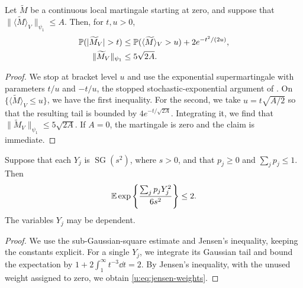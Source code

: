 \begin{lemma}\label{u:lem:bracket-tail}
Let $\widetilde M$ be a continuous local martingale starting at zero,
and suppose that $\|\langle\widetilde M\rangle_V\|_{\psi_1}\le A$.
Then, for $t,u>0$,
\begin{equation}\label{u:eq:bracket-tail}
\begin{aligned}
 \PP(|\widetilde M_V|>t)
 &\le\PP(\langle\widetilde M\rangle_V>u)+2e^{-t^2/(2u)},\\
 \|\widetilde M_V\|_{\psi_1}&\le5\sqrt{2A}.
\end{aligned}
\end{equation}
\end{lemma}

\begin{proof}
We stop at bracket level $u$ and use the exponential supermartingale
with parameters $t/u$ and $-t/u$, the stopped stochastic-exponential
argument of \cite[Section~3.5]{karatzas-shreve-1991}. On
$\{\langle\widetilde M\rangle_V\le u\}$, we have the first inequality.
For the second, we take $u=t\sqrt{A/2}$ so that the resulting tail is
bounded by $4e^{-t/\sqrt{2A}}$. Integrating it, we find that
$\|\widetilde M_V\|_{\psi_1}\le5\sqrt{2A}$. If $A=0$, the martingale is
zero and the claim is immediate.
\end{proof}

\begin{lemma}\label{u:lem:jensen-weights}
Suppose that each $Y_j$ is $\operatorname{SG}(s^2)$, where $s>0$,
and that $p_j\ge0$ and $\sum_jp_j\le1$. Then
\begin{equation}\label{u:eq:jensen-weights}
 \mathbb E\exp\left\{\frac{\sum_jp_jY_j^2}{6s^2}\right\}\le2.
\end{equation}
The variables $Y_j$ may be dependent.
\end{lemma}

\begin{proof}
We use the sub-Gaussian-square estimate
\cite[Lemma~2.7.6]{vershynin-2018} and Jensen's inequality, keeping the
constants explicit.
For a single $Y_j$, we integrate its Gaussian tail and bound the
expectation by $1+2\int_1^\infty t^{-3}\dd t=2$. By Jensen's inequality, with the
unused weight assigned to zero, we obtain \eqref{u:eq:jensen-weights}.
\end{proof}

